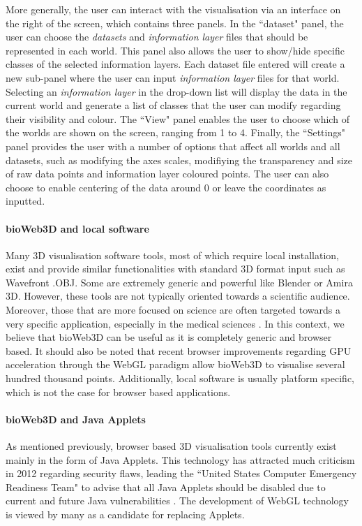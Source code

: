 	More generally, the user can interact with the visualisation via an interface on the right of the screen, which contains three panels. In the ``dataset" panel, the user can choose the {\it{datasets}} and {\it{information layer}} files that should be represented in each world. This panel also allows the user to show/hide specific classes of the selected information layers. Each dataset file entered will create a new sub-panel where the user can input {\it{information layer}} files for that world. Selecting an {\it{information layer}} in the drop-down list will display the data in the current world and generate a list of classes that the user can modify regarding their visibility and colour. The ``View" panel enables the user to choose which of the worlds are shown on the screen, ranging from 1 to 4. Finally, the ``Settings" panel provides the user with a number of options that affect all worlds and all datasets, such as modifying the axes scales, modifiying the transparency and size of raw data points and information layer coloured points. The user can also choose to enable centering of the data around 0 or leave the coordinates as inputted.

		\paragraph{bioWeb3D and local software}
Many 3D visualisation software tools, most of which require local installation, exist and provide similar functionalities with standard 3D format input such as Wavefront .OBJ. Some are extremely generic and powerful like Blender or Amira 3D. However, these tools are not typically oriented towards a scientific audience. Moreover, those that are more focused on science are often targeted towards a very specific application, especially in the medical sciences \cite{Wang093D}. In this context, we believe that bioWeb3D can be useful as it is completely generic and browser based. It should also be noted that recent browser improvements regarding GPU acceleration through the WebGL paradigm allow bioWeb3D to visualise several hundred thousand points. Additionally, local software is usually platform specific, which is not the case for browser based applications.

		\paragraph{bioWeb3D and Java Applets}
As mentioned previously, browser based 3D visualisation tools currently exist mainly in the form of Java Applets. This technology has attracted much criticism in 2012 regarding security flaws, leading the ``United States Computer Emergency Readiness Team" to advise that all Java Applets should be disabled due to current and future Java vulnerabilities \cite{security}. The development of WebGL technology is viewed by many as a candidate for replacing Applets. 



